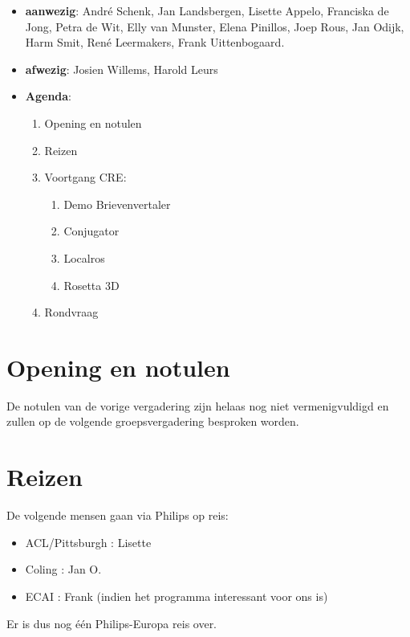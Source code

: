 
   \RosSupersedes{-}
   \MakeRosTitle



\begin{itemize}
  \item {\bf aanwezig}: Andr\'{e} Schenk, Jan Landsbergen, Lisette Appelo,
                     Franciska de Jong, Petra de Wit, Elly van Munster, 
                     Elena Pinillos, Joep Rous, Jan Odijk, Harm Smit,
                     Ren\'{e} Leermakers, Frank Uittenbogaard.

  \item {\bf afwezig}: Josien Willems, Harold Leurs 
  \item {\bf Agenda}:
    \begin{enumerate}
       \item Opening en notulen
       \item Reizen
       \item Voortgang CRE:
         \begin{enumerate} 
         \item Demo Brievenvertaler
         \item Conjugator
         \item Localros 
  	 \item Rosetta 3D
         \end{enumerate}
       \item Rondvraag
    \end{enumerate}
\end{itemize}

\section {Opening en notulen}
De notulen van de vorige vergadering zijn helaas nog niet vermenigvuldigd en 
zullen op de volgende groepsvergadering besproken worden.


\section {Reizen}

De volgende mensen gaan via Philips op reis:
\begin{itemize}
   \item ACL/Pittsburgh : Lisette
   \item Coling         : Jan O.
   \item ECAI           : Frank (indien het programma interessant voor ons is)
\end{itemize}
Er is dus nog \'{e}\'{e}n Philips-Europa reis over.\\

